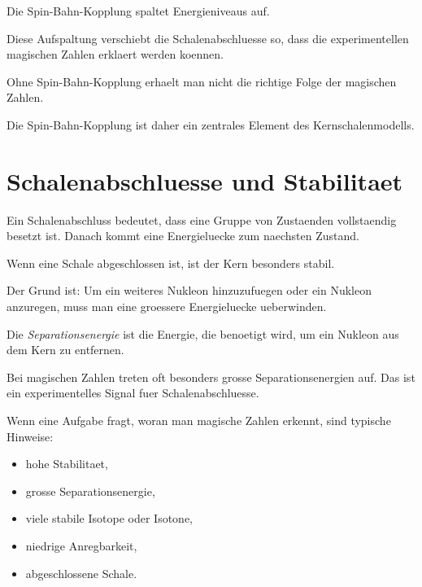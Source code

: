 \begin{conceptbox}
Die Spin-Bahn-Kopplung spaltet Energieniveaus auf.

Diese Aufspaltung verschiebt die Schalenabschluesse so, dass die experimentellen
magischen Zahlen erklaert werden koennen.
\end{conceptbox}

\begin{examtipbox}
Ohne Spin-Bahn-Kopplung erhaelt man nicht die richtige Folge der magischen Zahlen.

Die Spin-Bahn-Kopplung ist daher ein zentrales Element des Kernschalenmodells.
\end{examtipbox}

\section{Schalenabschluesse und Stabilitaet}

Ein Schalenabschluss bedeutet, dass eine Gruppe von Zustaenden vollstaendig besetzt ist.
Danach kommt eine Energieluecke zum naechsten Zustand.

\begin{conceptbox}
Wenn eine Schale abgeschlossen ist, ist der Kern besonders stabil.

Der Grund ist:
Um ein weiteres Nukleon hinzuzufuegen oder ein Nukleon anzuregen, muss man eine
groessere Energieluecke ueberwinden.
\end{conceptbox}

\begin{definitionbox}
Die \emph{Separationsenergie} ist die Energie, die benoetigt wird, um ein Nukleon
aus dem Kern zu entfernen.
\end{definitionbox}

\begin{conceptbox}
Bei magischen Zahlen treten oft besonders grosse Separationsenergien auf.
Das ist ein experimentelles Signal fuer Schalenabschluesse.
\end{conceptbox}

\begin{examtipbox}
Wenn eine Aufgabe fragt, woran man magische Zahlen erkennt, sind typische Hinweise:
\begin{itemize}
    \item hohe Stabilitaet,
    \item grosse Separationsenergie,
    \item viele stabile Isotope oder Isotone,
    \item niedrige Anregbarkeit,
    \item abgeschlossene Schale.
\end{itemize}
\end{examtipbox}

